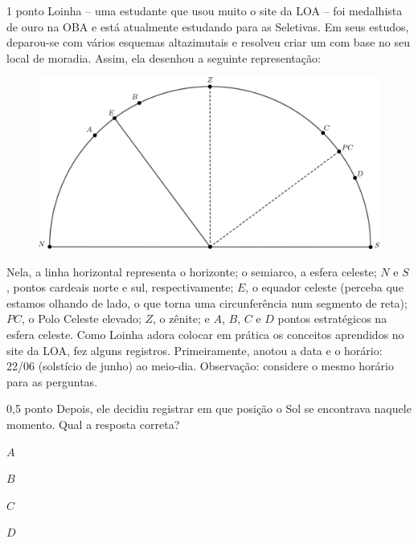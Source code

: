 \documentclass{../lista}
\begin{document}
	\begin{questao}{1 ponto}
		Loinha -- uma estudante que usou muito o site da LOA -- foi medalhista de ouro na OBA e está atualmente estudando para as Seletivas. Em seus estudos, deparou-se com vários esquemas altazimutais e resolveu criar um com base no seu local de moradia. Assim, ela desenhou a seguinte representação:
		\begin{figure}[H]
			\centering
			\includegraphics[scale=1.2]{./img/4.png}
		\end{figure}
		Nela, a linha horizontal representa o horizonte; o semiarco, a esfera celeste; $N$ e $S$, pontos cardeais norte e sul, respectivamente; $E$, o equador celeste (perceba que estamos olhando de lado, o que torna uma circunferência num segmento de reta); $PC$, o Polo Celeste elevado; $Z$, o zênite; e $A$, $B$, $C$ e $D$ pontos estratégicos na esfera celeste. \linebreak
		Como Loinha adora colocar em prática os conceitos aprendidos no site da LOA, fez alguns registros. Primeiramente, anotou a data e o horário: 22/06 (solstício de junho) ao meio-dia.\linebreak
		Observação: considere o mesmo horário para as perguntas.
		
		\begin{pergunta}{0,5 ponto}
			Depois, ele decidiu registrar em que posição o Sol se encontrava naquele momento. Qual a resposta correta?
			\begin{alternativas}
				\alternativaMarcada $A$
				\item $B$
				\item $C$
				\item $D$
			\end{alternativas}

		\end{pergunta}


\end{questao}
\end{document}
